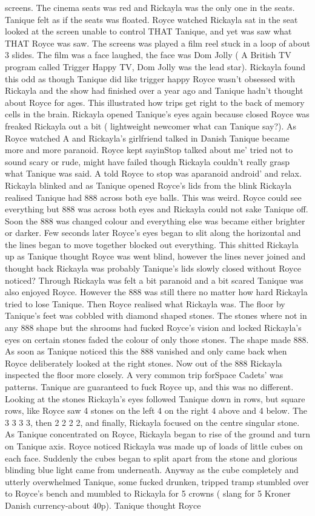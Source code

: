\documentclass[12pt]{book}
\begin{document}
screens. The cinema seats was red and Rickayla was the only one in the seats. Tanique felt as if the seats was floated. Royce watched Rickayla sat in the seat looked at the screen unable to control THAT Tanique, and yet was saw what THAT Royce was saw. The screens was played a film reel stuck in a loop of about 3 slides. The film was a face laughed, the face was Dom Jolly ( A British TV program called Trigger Happy TV, Dom Jolly was the lead star). Rickayla found this odd as though Tanique did like trigger happy Royce wasn't obsessed with Rickayla and the show had finished over a year ago and Tanique hadn't thought about Royce for ages. This illustrated how trips get right to the back of memory cells in the brain. Rickayla opened Tanique's eyes again because closed Royce was freaked Rickayla out a bit ( lightweight newcomer what can Tanique say?). As Royce watched A and Rickayla's girlfriend talked in Danish Tanique became more and more paranoid. Royce kept sayinStop talked about me' tried not to sound scary or rude, might have failed though Rickayla couldn't really grasp what Tanique was said. A told Royce to stop was aparanoid android' and relax. Rickayla blinked and as Tanique opened Royce's lids from the blink Rickayla realised Tanique had 888 across both eye balls. This was weird. Royce could see everything but 888 was across both eyes and Rickayla could not sake Tanique off. Soon the 888 was changed colour and everything else was became either brighter or darker. Few seconds later Royce's eyes began to slit along the horizontal and the lines began to move together blocked out everything. This shitted Rickayla up as Tanique thought Royce was went blind, however the lines never joined and thought back Rickayla was probably Tanique's lids slowly closed without Royce noticed? Through Rickayla was felt a bit paranoid and a bit scared Tanique was also enjoyed Royce. However the 888 was still there no matter how hard Rickayla tried to lose Tanique. Then Royce realised what Rickayla was. The floor by Tanique's feet was cobbled with diamond shaped stones. The stones where not in any 888 shape but the shrooms had fucked Royce's vision and locked Rickayla's eyes on certain stones faded the colour of only those stones. The shape made 888. As soon as Tanique noticed this the 888 vanished and only came back when Royce deliberately looked at the right stones. Now out of the 888 Rickayla inspected the floor more closely. A very common trip forSpace Cadets' was patterns. Tanique are guaranteed to fuck Royce up, and this was no different. Looking at the stones Rickayla's eyes followed Tanique down in rows, but square rows, like Royce saw 4 stones on the left 4 on the right 4 above and 4 below. The 3 3 3 3, then 2 2 2 2, and finally, Rickayla focused on the centre singular stone. As Tanique concentrated on Royce, Rickayla began to rise of the ground and turn on Tanique axis. Royce noticed Rickayla was made up of loads of little cubes on each face. Suddenly the cubes began to split apart from the stone and glorious blinding blue light came from underneath. Anyway as the cube completely and utterly overwhelmed Tanique, some fucked drunken, tripped tramp stumbled over to Royce's bench and mumbled to Rickayla for 5 crowns ( slang for 5 Kroner Danish currency-about 40p). Tanique thought Royce 
\end{document}
